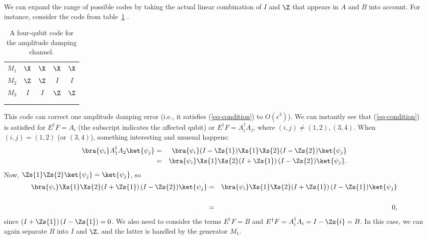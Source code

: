 We can expand the range of possible codes by taking the actual linear
combination of $I$ and $\Z$ that appears in $A$ and $B$ into account.  For
instance, consider the code from table~\ref{table-amplitude} \cite{leung}.
\begin{table}
	\centering
	\begin{tabular}{c|cccc}
		$M_1$ & $\X$ & $\X$ & $\X$ & $\X$ \\
		$M_2$ & $\Z$ & $\Z$ & $I$ & $I$ \\
		$M_3$ & $I$ & $I$ & $\Z$ & $\Z$ \\
		\hline
		\low{$\Xbar$} & \low{$\X$} & \low{$\X$} & \low{$I$} & \low{$I$} \\
		\low{$\Zbar$} & \low{$\Z$} & \low{$I$} & \low{$\Z$} & \low{$I$}
	\end{tabular}
	\caption{A four-qubit code for the amplitude damping channel.}
	\label{table-amplitude}
\end{table}
This code can correct one amplitude damping error (i.e., it satisfies
(\ref{eq-condition}) to $O(\epsilon^3)$).  We can instantly see that
(\ref{eq-condition}) is satisfied for $E^\dagger F = A_i$ (the subscript
indicates the affected qubit) or $E^\dagger F = A_i^\dagger A_j$, where
$(i, j) \neq (1, 2), (3, 4)$.  When $(i, j) = (1,2)$ (or $(3,4)$), something
interesting and unusual happens:
\begin{eqnarray}
	\bra{\psi_i} A_1^\dagger A_2 \ket{\psi_j} & = &
	\bra{\psi_i} (I - \Zs{1}) \Xs{1} \Xs{2} (I - \Zs{2}) \ket{\psi_j} \\
	& = & \bra{\psi_i} \Xs{1} \Xs{2} (I + \Zs{1})\,(I - \Zs{2}) \ket{\psi_j}.
\end{eqnarray}
Now, $\Zs{1} \Zs{2} \ket{\psi_j} = \ket{\psi_j}$, so
\begin{eqnarray}
	\bra{\psi_i} \Xs{1} \Xs{2} (I + \Zs{1})\,(I - \Zs{2}) \ket{\psi_j}
	& = & \bra{\psi_i} \Xs{1} \Xs{2} (I + \Zs{1})\,(I - \Zs{1}) \ket{\psi_j}
	\nonumber \\
	\\
	& = & 0,
\end{eqnarray}
since $(I + \Zs{1})\,(I - \Zs{1}) = 0$.  We also need to consider the terms
$E^\dagger F = B$ and $E^\dagger F = A_i^\dagger A_i = I - \Zs{i} = B$.  In
this case, we can again separate $B$ into $I$ and $\Z$, and the latter is
handled by the generator $M_1$.

